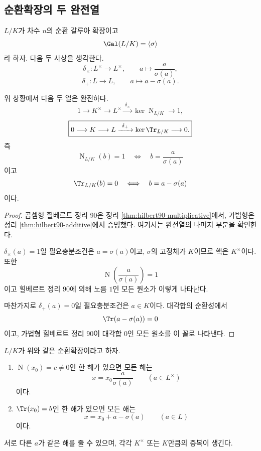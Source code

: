 \subsection{순환확장의 두 완전열}

$L/K$가 차수 $n$의 순환 갈루아 확장이고
\[
  \Gal(L/K)=\langle\sigma\rangle
\]
라 하자. 다음 두 사상을 생각한다.
\[
  \delta_\times:L^\times\longrightarrow L^\times,
  \qquad
  a\longmapsto\frac{a}{\sigma(a)},
\]
\[
  \delta_+:L\longrightarrow L,
  \qquad
  a\longmapsto a-\sigma(a).
\]

\begin{theorem}
\label{thm:hilbert90-exact-sequences}
위 상황에서 다음 두 열은 완전하다.
\[
  \boxed{
  1\longrightarrow K^\times
  \longrightarrow L^\times
  \xrightarrow{\ \delta_\times\ }
  \ker\operatorname N_{L/K}
  \longrightarrow1,}
\]
\[
  \boxed{
  0\longrightarrow K
  \longrightarrow L
  \xrightarrow{\ \delta_+\ }
  \ker\Tr_{L/K}
  \longrightarrow0.}
\]
즉
\[
  \operatorname N_{L/K}(b)=1
  \quad\Longleftrightarrow\quad
  b=\frac{a}{\sigma(a)}
\]
이고
\[
  \Tr_{L/K}(b)=0
  \quad\Longleftrightarrow\quad
  b=a-\sigma(a)
\]
이다.
\end{theorem}

\begin{proof}
곱셈형 힐베르트 정리 90은 정리 \ref{thm:hilbert90-multiplicative}에서, 가법형은 정리 \ref{thm:hilbert90-additive}에서 증명했다. 여기서는 완전열의 나머지 부분을 확인한다.

$\delta_\times(a)=1$일 필요충분조건은 $a=\sigma(a)$이고, $\sigma$의 고정체가 $K$이므로 핵은 $K^\times$이다. 또한
\[
  \operatorname N\left(\frac{a}{\sigma(a)}\right)=1
\]
이고 힐베르트 정리 90에 의해 노름 $1$인 모든 원소가 이렇게 나타난다.

마찬가지로 $\delta_+(a)=0$일 필요충분조건은 $a\in K$이다. 대각합의 순환성에서
\[
  \Tr(a-\sigma(a))=0
\]
이고, 가법형 힐베르트 정리 90이 대각합 $0$인 모든 원소를 이 꼴로 나타낸다.
\end{proof}

\begin{corollary}[순환확장의 모든 해]
\label{cor:cyclic-norm-trace-all-solutions}
$L/K$가 위와 같은 순환확장이라고 하자.
\begin{enumerate}[label=(\roman*)]
  \item $\operatorname N(x_0)=c\ne0$인 한 해가 있으면 모든 해는
  \[
    x=x_0\frac{a}{\sigma(a)}
    \qquad(a\in L^\times)
  \]
  이다.
  \item $\Tr(x_0)=b$인 한 해가 있으면 모든 해는
  \[
    x=x_0+a-\sigma(a)
    \qquad(a\in L)
  \]
  이다.
\end{enumerate}
서로 다른 $a$가 같은 해를 줄 수 있으며, 각각 $K^\times$ 또는 $K$만큼의 중복이 생긴다.
\end{corollary}

